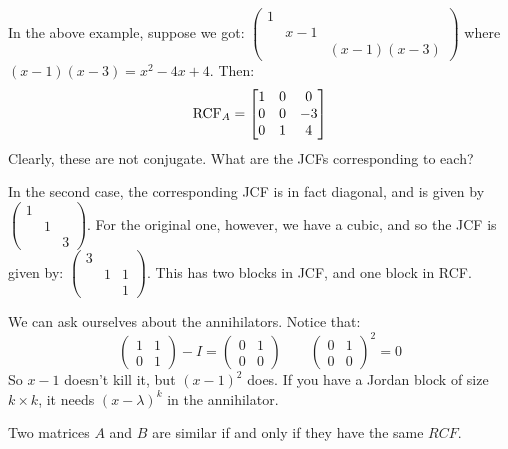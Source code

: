In the above example, suppose we got:
$ \begin{pmatrix}
    1 & & \\
      & x-1 & \\
      & & (x-1)(x-3)
\end{pmatrix} $ where $ (x-1)(x-3) = x^{2}-4x+4 $.
Then:
\begin{equation*}
    \textrm{RCF}_{A} = \begin{bmatrix}
        1 & 0 & 0 \\ 0 & 0 & -3 \\ 0 & 1 & 4
    \end{bmatrix}
\end{equation*}
Clearly, these are not conjugate.
What are the JCFs corresponding to each?

In the second case, the corresponding JCF is in fact diagonal, and is given by
$ \begin{pmatrix}
    1 & & \\ & 1 & \\ & & 3
\end{pmatrix} $.
For the original one, however, we have a cubic, and so the JCF is given by:
$ \begin{pmatrix}
    3 & & \\ & 1 & 1 \\ & & 1
\end{pmatrix} $.
This has two blocks in JCF, and one block in RCF.

We can ask ourselves about the annihilators. Notice that:
\begin{equation*}
    \begin{pmatrix}
        1 & 1 \\ 0 & 1
    \end{pmatrix} - I =
    \begin{pmatrix}
        0 & 1 \\ 0 & 0
    \end{pmatrix}
    \qquad
    \begin{pmatrix}
        0 & 1 \\ 0 & 0
    \end{pmatrix}^{2} = 0
\end{equation*}
So $ x-1 $ doesn't kill it, but $ (x-1)^{2} $ does.
If you have a Jordan block of size $ k\times k $, it needs $ (x-\lambda)^{k} $
in the annihilator.

\begin{thm}
    Two matrices $ A $ and $ B $ are similar if and only if they have the
    same $ RCF $.
\end{thm}

